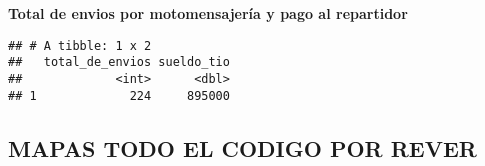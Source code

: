 \documentclass[
]{article}
\begin{document}
\textbf{Total de envios por motomensajería y pago al repartidor}

\begin{verbatim}
## # A tibble: 1 x 2
##   total_de_envios sueldo_tio
##             <int>      <dbl>
## 1             224     895000
\end{verbatim}

\hypertarget{mapas-todo-el-codigo-por-rever}{%
\subsection{MAPAS TODO EL CODIGO POR
REVER}\label{mapas-todo-el-codigo-por-rever}}
\end{document}
